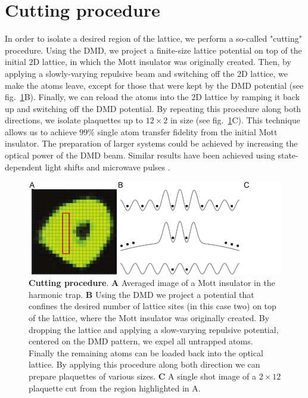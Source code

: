 \section{Cutting procedure}

In order to isolate a desired region of the lattice, we perform a so-called "cutting" procedure. Using the DMD, we project a finite-size lattice potential on top of the initial $2\mathrm{D}$ lattice, in which the Mott insulator was originally created. Then, by applying a slowly-varying repulsive beam and switching off the $2\mathrm{D}$ lattice, we make the atoms leave, except for those that were kept by the DMD potential (see fig.~\ref{fig:CTE_cutting}B). Finally, we can reload the atoms into the $2\mathrm{D}$ lattice by ramping it back up and switching off the DMD potential. By repeating this procedure along both directions, we isolate plaquettes up to $12\times2$ in size (see fig.~\ref{fig:CTE_cutting}C). This technique allows us to achieve $99\%$ single atom transfer fidelity from the initial Mott insulator. The preparation of larger systems could be achieved by increasing the optical power of the DMD beam. Similar results have been achieved using state-dependent light shifts and microwave pulses \cite{Bloch single site addresing}.

\begin{figure}[t]
	\centering
	\includegraphics[scale=1]{figures/CTE_cutting.pdf}
	\caption{{\bf Cutting procedure}. {\bf A} Averaged image of a Mott insulator in the harmonic trap. {\bf B} Using the DMD we project a potential that confines the desired number of lattice sites (in this case two) on top of the lattice, where the Mott insulator was originally created. By dropping the lattice and applying a slow-varying repulsive potential, centered on the DMD pattern, we expel all untrapped atoms. Finally the remaining atoms can be loaded back into the optical lattice. By applying this procedure along both direction we can prepare plaquettes of various sizes. {\bf C} A single shot image of a $2 \times 12$ plaquette cut from the region highlighted in A.}
	\label{fig:CTE_cutting}
\end{figure}

